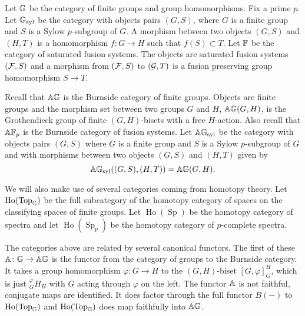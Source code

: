 \documentclass[10pt]{amsart}
\theoremstyle{definition}
\DeclareMathOperator{\Sp}{Sp}
\DeclareMathOperator{\Top}{Top}
\DeclareMathOperator{\Ho}{Ho}
\newtheorem{definition}[theorem]{Definition}
\renewcommand{\phi}{\varphi}
\begin{document}


Let $\mathbb{G}$ be the category of finite groups and group homomorphisms. Fix a prime $p$. Let $\mathbb{G}_{\text{syl}}$ be the category with objects pairs $(G,S)$, where $G$ is a finite group and $S$ is a Sylow $p$-subgroup of $G$. A morphism between two objects $(G,S)$ and $(H,T)$ is a homomorphism $f \colon G \rightarrow H$ such that $f(S) \subset T$. Let $\mathbb{F}$ be the category of saturated fusion systems. The objects are saturated fusion systems $(\mathcal{F},S)$ and a morphism from $(\mathcal{F},S)$ to $(\mathcal{G},T)$ is a fusion preserving group homomorphism $S \rightarrow T$.


Recall that $\mathbb{A} \mathbb{G}$ is the Burnside category of finite groups. Objects are finite groups and the morphism set between two groups $G$ and $H$, $\mathbb{A} \mathbb{G}(G,H)$, is the Grothendieck group of finite $(G,H)$-bisets with a free $H$-action. Also recall that $\mathbb{A} \mathbb{F}_p$ is the Burnside category of fusion systems. Let $\mathbb{A} \mathbb{G}_{\text{syl}}$ be the category with objects pairs $(G,S)$ where $G$ is a finite group and $S$ is a Sylow $p$-subgroup of $G$ and with morphisms between two objects $(G,S)$ and $(H,T)$ given by
\[
\mathbb{A} \mathbb{G}_{\text{syl}}((G,S),(H,T)) = \mathbb{A} \mathbb{G}(G,H).
\]


\begin{comment}
\begin{definition}
Let $\AP_p$ be the $p$-complete Burnside category of $p$-groups. Objects in $\AP_p$ are $p$-groups and morphisms between two $p$-groups $S$ and $T$ are given by
\[
\AP_p(S,T) = \Z_p \otimes \AG(S,T).
\]
\end{definition}
\end{comment}

We will also make use of several categories coming from homotopy theory. Let $\Ho(\Top_{\G})$ be the full subcategory of the homotopy category of spaces on the classifying spaces of finite groups. Let $\Ho(\Sp)$ be the homotopy category of spectra and let $\Ho(\Sp_p)$ be the homotopy category of $p$-complete spectra.


The categories above are related by several canonical functors.
The first of these $\mathbb{A} \colon \mathbb{G} \rightarrow \mathbb{A} \mathbb{G}$ is the functor from the category of groups to the Burnside category. It takes a group homomorphism $\phi \colon G \rightarrow H$ to the $(G,H)$-biset $[G,\phi]_{G}^{H}$, which is just ${}_G^\phi H_H$ with $G$ acting through $\phi$ on the left. The functor $\mathbb{A}$ is not faithful, conjugate maps are identified. It does factor through the full functor $B(-)$ to $\Ho(\Top_{\G})$ and $\Ho(\Top_{\G})$ does map faithfully into $\mathbb{A} \mathbb{G}$.
\end{document}
